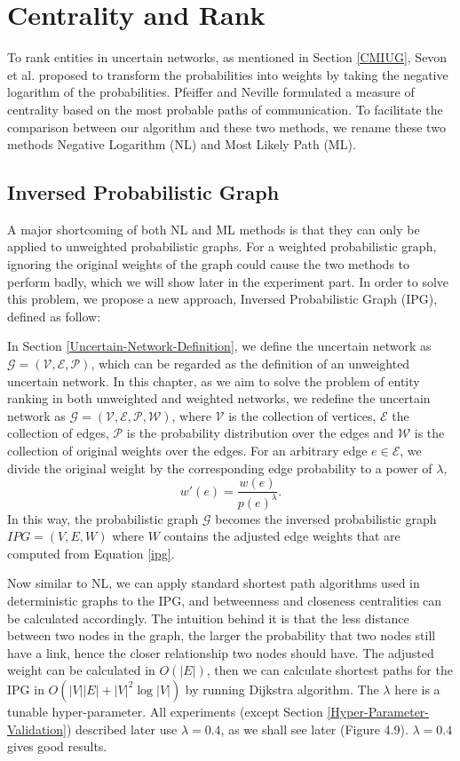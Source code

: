 \documentclass[\main/thesis.tex]{subfiles}
\begin{document}
\chapter{Centrality and Rank}
To rank entities in uncertain networks, as mentioned in Section \ref{CMIUG}, Sevon et al. \cite{sevon2006link} proposed to transform the probabilities into weights by taking the negative logarithm of the probabilities. Pfeiffer and Neville \cite{pfeiffer2010probabilistic} formulated a measure of centrality based on the most probable paths of communication. To facilitate the comparison between our algorithm and these two methods, we rename these two methods Negative Logarithm (NL) and Most Likely Path (ML).

\section{Inversed Probabilistic Graph} \label{Inversed-Probabilistic-Graph}

A major shortcoming of both NL and ML methods is that they can only be applied to unweighted probabilistic graphs. For a weighted probabilistic graph, ignoring the original weights of the graph could cause the two methods to perform badly, which we will show later in the experiment part. In order to solve this problem, we propose a new approach, Inversed Probabilistic Graph (IPG), defined as follow:

In Section \ref{Uncertain-Network-Definition}, we define the uncertain network as $\mathcal{G = (V,E,P)}$, which can be regarded as the definition of an unweighted uncertain network. In this chapter, as we aim to solve the problem of entity ranking in both unweighted and weighted networks, we redefine the uncertain network as $\mathcal{G = (V,E,P,W)}$, where $\mathcal{V}$ is the collection of vertices, $\mathcal{E}$ the collection of edges, $\mathcal{P}$ is the probability distribution over the edges and $\mathcal{W}$ is the collection of original weights over the edges. For an arbitrary edge $e \in \mathcal{E}$, we divide the original weight by the corresponding edge probability to a power of $\lambda$,
\begin{equation}
w'(e) = \frac{w(e)}{p(e)^\lambda }. \label{ipg}
\end{equation}
In this way, the probabilistic graph $\mathcal{G}$ becomes the inversed probabilistic graph $IPG = (V, E, W)$ where $W$ contains the adjusted edge weights that are computed from Equation \ref{ipg}.

Now similar to NL, we can apply standard shortest path algorithms used in deterministic graphs to the IPG, and betweenness and closeness centralities can be calculated accordingly. The intuition behind it is that the less distance between two nodes in the graph, the larger the probability that two nodes still have a link, hence the closer relationship two nodes should have. The adjusted weight can be calculated in $O(|E|)$, then we can calculate shortest paths for the IPG in $O(|V||E|+|V|^2 \log|V|)$ by running Dijkstra algorithm. The $\lambda$ here is a tunable hyper-parameter. All experiments (except Section \ref{Hyper-Parameter-Validation}) described later use $\lambda = 0.4$, as we shall see later (Figure 4.9). $\lambda = 0.4$ gives good results.
\end{document}
